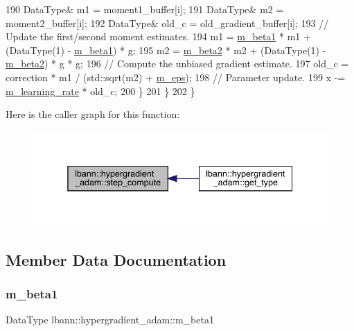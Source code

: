 \begin{DoxyCode}
190       DataType& m1 = moment1\_buffer[i];
191       DataType& m2 = moment2\_buffer[i];
192       DataType& old\_c = old\_gradient\_buffer[i];
193       \textcolor{comment}{// Update the first/second moment estimates.}
194       m1 = \hyperlink{classlbann_1_1hypergradient__adam_a876a8bc1ee9a47479008d204048724e7}{m\_beta1} * m1 + (DataType(1) - \hyperlink{classlbann_1_1hypergradient__adam_a876a8bc1ee9a47479008d204048724e7}{m\_beta1}) * g;
195       m2 = \hyperlink{classlbann_1_1hypergradient__adam_a0effe7359fa37f02a40f059281580760}{m\_beta2} * m2 + (DataType(1) - \hyperlink{classlbann_1_1hypergradient__adam_a0effe7359fa37f02a40f059281580760}{m\_beta2}) * g * g;
196       \textcolor{comment}{// Compute the unbiased gradient estimate.}
197       old\_c = correction * m1 / (std::sqrt(m2) + \hyperlink{classlbann_1_1hypergradient__adam_a5bae9101fcc235d961ae7713706f4ff7}{m\_eps});
198       \textcolor{comment}{// Parameter update.}
199       x -= \hyperlink{classlbann_1_1optimizer_ad393dcdcb82b44510c586ed5ec46d4dd}{m\_learning\_rate} * old\_c;
200     \}
201   \}
202 \}
\end{DoxyCode}
Here is the caller graph for this function\+:\nopagebreak
\begin{figure}[H]
\begin{center}
\leavevmode
\includegraphics[width=338pt]{classlbann_1_1hypergradient__adam_af9168cfd95707f361f0412ff2440761f_icgraph}
\end{center}
\end{figure}


\subsection{Member Data Documentation}
\mbox{\label{classlbann_1_1hypergradient__adam_a876a8bc1ee9a47479008d204048724e7}} 
\subsubsection{\texorpdfstring{m\+\_\+beta1}{m\_beta1}}
{\footnotesize\ttfamily Data\+Type lbann\+::hypergradient\+\_\+adam\+::m\+\_\+beta1\hspace{0.3cm}{\ttfamily [private]}}

